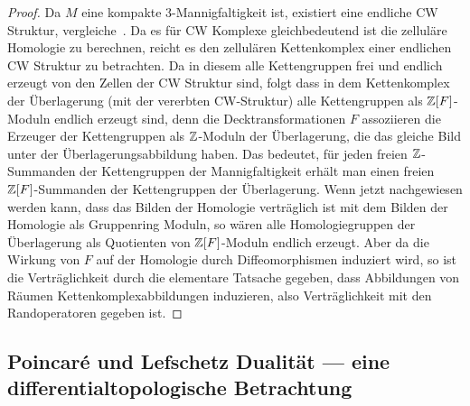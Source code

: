 	\begin{proof}
	Da $M$ eine kompakte 3-Mannigfaltigkeit ist, existiert eine endliche CW Struktur, vergleiche~\cite{Moise.1952}. Da es für CW Komplexe gleichbedeutend ist die zelluläre Homologie zu berechnen, reicht es den zellulären Kettenkomplex einer endlichen CW Struktur zu betrachten. Da in diesem alle Kettengruppen frei und endlich erzeugt von den Zellen der CW Struktur sind, folgt dass in dem Kettenkomplex der Überlagerung (mit der vererbten CW-Struktur) alle Kettengruppen als $\mathbb{Z}[F]$-Moduln endlich erzeugt sind, denn die Decktransformationen $F$ assoziieren die Erzeuger der Kettengruppen als $\mathbb{Z}$-Moduln der Überlagerung, die das gleiche Bild unter der Überlagerungsabbildung haben. Das bedeutet, für jeden freien $\mathbb{Z}$-Summanden der Kettengruppen der Mannigfaltigkeit erhält man einen freien $\mathbb{Z}[F]$-Summanden der Kettengruppen der Überlagerung. Wenn jetzt nachgewiesen werden kann, dass das Bilden der Homologie verträglich ist mit dem Bilden der Homologie als Gruppenring Moduln, so wären alle Homologiegruppen der Überlagerung als Quotienten von $\mathbb{Z}[F]$-Moduln endlich erzeugt. Aber da die Wirkung von $F$ auf der Homologie durch Diffeomorphismen induziert wird, so ist die Verträglichkeit durch die elementare Tatsache gegeben, dass Abbildungen von Räumen Kettenkomplexabbildungen induzieren, also Verträglichkeit mit den Randoperatoren gegeben ist.
\end{proof}

%



\subsection{Poincaré und Lefschetz Dualität --- eine differentialtopologische Betrachtung}
\label{sec:poinc}

